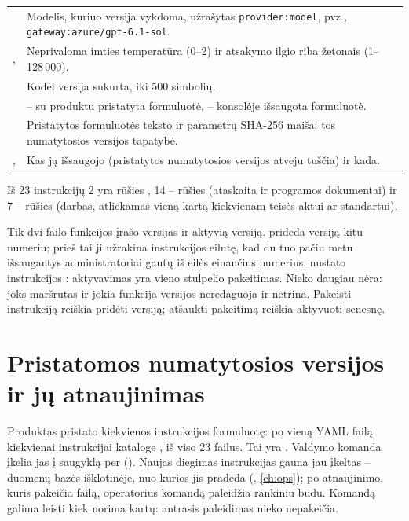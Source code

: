 \begin{table}[H]
\begin{tabularx}{\textwidth}{@{}L{34mm}Y@{}}
 & Modelis, kuriuo versija vykdoma, užrašytas \texttt{provider:model}, pvz., \texttt{gateway:azure/gpt-6.1-sol}. \\
,  & Neprivaloma imties temperatūra (0–2) ir atsakymo ilgio riba žetonais (1–128\,000). \\
 & Kodėl versija sukurta, iki 500 simbolių. \\
 &  -- su produktu pristatyta formuluotė,  -- konsolėje išsaugota formuluotė. \\
 & Pristatytos formuluotės teksto ir parametrų SHA-256 maiša: tos numatytosios versijos tapatybė. \\
,  & Kas ją išsaugojo (pristatytos numatytosios versijos atveju tuščia) ir kada. \\
\bottomrule
\end{tabularx}
\end{table}

Iš 23 instrukcijų 2 yra rūšies , 14 -- rūšies  (ataskaita ir
programos dokumentai) ir 7 -- rūšies  (darbas, atliekamas vieną kartą kiekvienam
teisės aktui ar standartui).

Tik dvi failo  funkcijos įrašo versijas ir aktyvią
versiją.  prideda versiją kitu numeriu; prieš tai ji užrakina instrukcijos
eilutę, kad du tuo pačiu metu išsaugantys administratoriai gautų iš eilės einančius numerius.
 nustato instrukcijos : aktyvavimas yra vieno
stulpelio pakeitimas. Nieko daugiau nėra: joks maršrutas ir jokia funkcija versijos neredaguoja
ir netrina. Pakeisti instrukciją reiškia pridėti versiją; atšaukti pakeitimą reiškia aktyvuoti
senesnę.


\section{Pristatomos numatytosios versijos ir jų atnaujinimas}\label{sec:prompts:defaults}

Produktas pristato kiekvienos instrukcijos formuluotę: po vieną YAML failą kiekvienai
instrukcijai kataloge , iš viso 23 failus. Tai yra . Valdymo komanda  įkelia jas į saugyklą per 
(). Naujas diegimas instrukcijas gauna jau įkeltas -- duomenų bazės
išklotinėje, nuo kurios jis pradeda (, \cref{ch:ops}); po
atnaujinimo, kuris pakeičia failą, operatorius komandą paleidžia rankiniu būdu. Komandą
galima leisti kiek norima kartų: antrasis paleidimas nieko nepakeičia.

